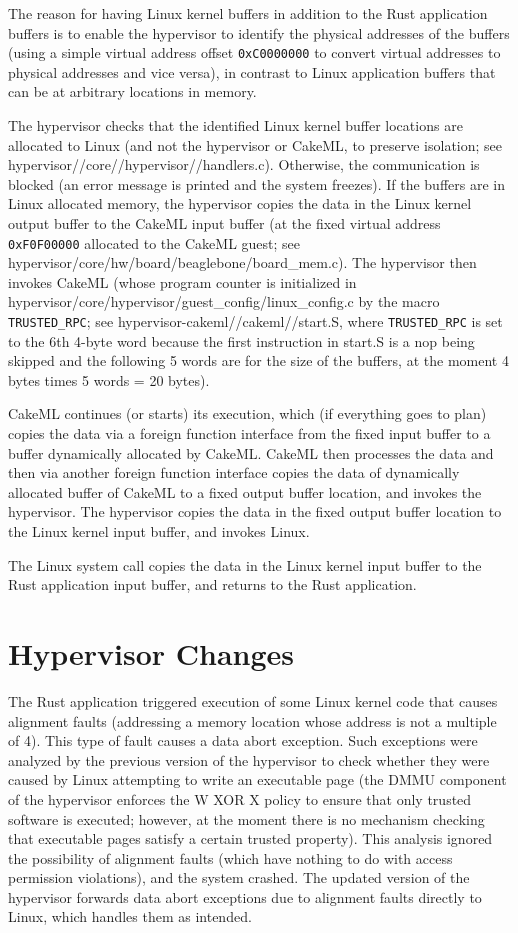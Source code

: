 \documentclass[11pt, a4paper]{article}
\begin{document}
The reason for having Linux kernel buffers in addition to the Rust application
buffers is to enable the hypervisor to identify the physical addresses of the
buffers (using a simple virtual address offset \texttt{0xC0000000} to convert virtual
addresses to physical addresses and vice versa), in contrast to Linux
application buffers that can be at arbitrary locations in memory.

The hypervisor checks that the identified Linux kernel buffer locations are
allocated to Linux (and not the hypervisor or CakeML, to preserve isolation;
see hypervisor//core//hypervisor//handlers.c). Otherwise, the communication is
blocked (an error message is printed and the system freezes). If the buffers are
in Linux allocated memory, the hypervisor copies the data in the Linux kernel
output buffer to the CakeML input buffer (at the fixed virtual address
\texttt{0xF0F00000} allocated to the CakeML guest; see
hypervisor/core/hw/board/beaglebone/board\_mem.c). The hypervisor then invokes
CakeML (whose program counter is initialized in
hypervisor/core/hypervisor/guest\_config/linux\_config.c by the macro \texttt{TRUSTED\_RPC};
see hypervisor-cakeml//cakeml//start.S, where \texttt{TRUSTED\_RPC} is set to the 6th 4-byte
word because the first instruction in start.S is a nop being skipped and the
following 5 words are for the size of the buffers, at the moment 4 bytes times
5 words = 20 bytes).

CakeML continues (or starts) its execution, which (if everything goes to plan)
copies the data via a foreign function interface from the fixed input buffer to
a buffer dynamically allocated by CakeML. CakeML then processes the data and
then via another foreign function interface copies the data of dynamically
allocated buffer of CakeML to a fixed output buffer location, and invokes the
hypervisor. The hypervisor copies the data in the fixed output buffer location
to the Linux kernel input buffer, and invokes Linux.

The Linux system call copies the data in the Linux kernel input buffer to the
Rust application input buffer, and returns to the Rust application.

\section*{Hypervisor Changes}
The Rust application triggered execution of some Linux kernel code that causes
alignment faults (addressing a memory location whose address is not a multiple
of 4). This type of fault causes a data abort exception. Such exceptions were
analyzed by the previous version of the hypervisor to check whether they were
caused by Linux attempting to write an executable page (the DMMU component of
the hypervisor enforces the W XOR X policy to ensure that only trusted software
is executed; however, at the moment there is no mechanism checking that
executable pages satisfy a certain trusted property). This analysis ignored the
possibility of alignment faults (which have nothing to do with access permission
violations), and the system crashed. The updated version of the hypervisor
forwards data abort exceptions due to alignment faults directly to Linux, which
handles them as intended.
\end{document}
